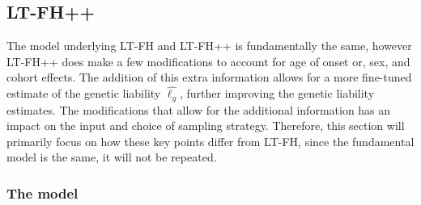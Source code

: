 \subsection{LT-FH++}

The model underlying LT-FH and LT-FH++ is fundamentally the same, however LT-FH++ does make a few modifications to account for age of onset or, sex, and cohort effects. The addition of this extra information allows for a more fine-tuned estimate of the genetic liability $ \hat{\ell_g} $, further improving the genetic liability estimates. The modifications that allow for the additional information has an impact on the input and choice of sampling strategy. Therefore, this section will primarily focus on how these key points differ from LT-FH, since the fundamental model is the same, it will not be repeated. 

\subsubsection{The model}


